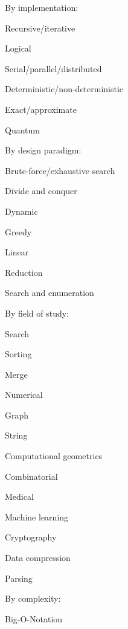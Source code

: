 \begin{multicols}{2}
\begin{itemize}
  {\setlength\itemindent{-26pt} \item[] By implementation:}
  \item Recursive/iterative
  \item Logical
  \item Serial/parallel/distributed
  \item Deterministic/non-deterministic
  \item Exact/approximate
  \item Quantum
\end{itemize}

\begin{itemize}
  {\setlength\itemindent{-26pt} \item[] By design paradigm:}
  \item Brute-force/exhaustive search
  \item Divide and conquer
  \item Dynamic
  \item Greedy
  \item Linear
  \item Reduction
  \item Search and enumeration
\end{itemize}

\begin{itemize}
  {\setlength\itemindent{-26pt} \item[] By field of study:}
  \item Search
  \item Sorting
  \item Merge
  \item Numerical
  \item Graph
  \item String
  \item Computational geometrics
  \item Combinatorial
  \item Medical
  \item Machine learning
  \item Cryptography
  \item Data compression
  \item Parsing
\end{itemize}

\begin{itemize}
  {\setlength\itemindent{-26pt} \item[] By complexity:}
  \item Big-O-Notation
\end{itemize}
\end{multicols}

